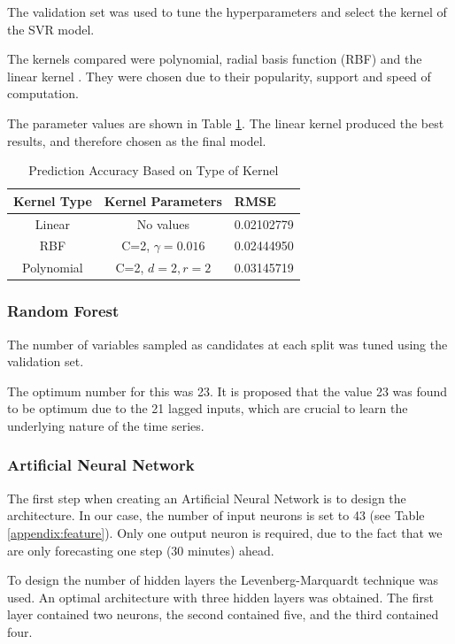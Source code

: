 The validation set was used to tune the hyperparameters and select the kernel of the SVR model.

The kernels compared were polynomial, radial basis function (RBF) and the linear kernel \cite{Chang2010, theodoridis2009pattern}. They were chosen due to their popularity, support and speed of computation.

The parameter values are shown in Table \ref{tab:kernel}. The linear kernel produced the best results, and therefore chosen as the final model.
\begin{table}
\centering
	\label{tab:kernel}
	\begin{tabular}{ccl}
		\toprule
		Kernel Type& Kernel Parameters & RMSE\\
		\midrule
		Linear & No values & 0.02102779\\
		RBF & C=2, $\gamma=0.016$ & 0.02444950\\
		Polynomial & C=2, $d=2, r=2$ & 0.03145719 \\
		\bottomrule
	\end{tabular}
\caption{Prediction Accuracy Based on Type of Kernel}
\end{table}
\subsubsection{Random Forest}
The number of variables sampled as candidates at each split was tuned using the validation set.

The optimum number for this was 23. It is proposed that the value 23 was found to be optimum due to the 21 lagged inputs, which are crucial to learn the underlying nature of the time series.


\subsubsection{Artificial Neural Network}

The first step when creating an Artificial Neural Network is to design the architecture. In our case, the number of input neurons is set to 43 (see Table \ref{appendix:feature}). Only one output neuron is required, due to the fact that we are only forecasting one step (30 minutes) ahead.

To design the number of hidden layers the Levenberg-Marquardt technique was used. An optimal architecture with three hidden layers was obtained. The first layer contained two neurons, the second contained five, and the third contained four.

